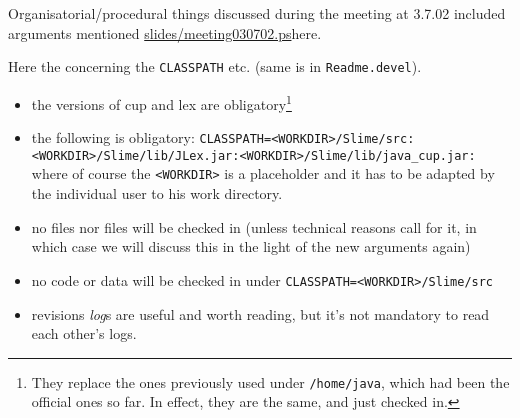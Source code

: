 Organisatorial/procedural things discussed during the meeting at 3.7.02
included arguments mentioned \url{slides/meeting030702.ps}{here.}


Here the  concerning the \texttt{CLASSPATH}
etc. (same is in \texttt{Readme.devel}).

\begin{itemize}
\item the  versions of cup and lex are
  obligatory\footnote{They replace the ones previously used under
    \texttt{/home/java}, which had been the official ones so far. In
    effect, they are the same, and just checked in.}
\item the following  is obligatory:
  \texttt{CLASSPATH=<WORKDIR>/Slime/src:<WORKDIR>/Slime/lib/JLex.jar:<WORKDIR>/Slime/lib/java_cup.jar:}
  where of course the \texttt{<WORKDIR>} is a placeholder and it has to be
  adapted by the individual user to his work directory.
\item no  files nor  files will be
  checked in (unless technical reasons call for it, in which case we will
  discuss this in the light of the new arguments again)
\item no  code or data will be checked in under
  \texttt{CLASSPATH=<WORKDIR>/Slime/src}
\item revisions \emph{log}s are useful and worth reading, but it's not
  mandatory to read each other's logs.
\end{itemize}



